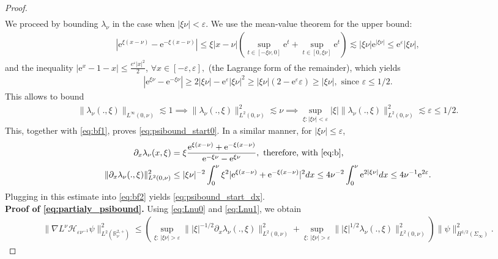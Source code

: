 \documentclass[report]{elsarticle}
\numberwithin{theorem}{section}
\newcommand{\re}{\varepsilon}
\begin{document}
\begin{proof}
\begin{align}
\end{align}
We proceed by bounding $\lambda_{\nu}$ in the case when $|\xi\nu|<\re$. We use the mean-value theorem for the upper bound:
\begin{align*}
	|\mathrm{e}^{\xi(x-\nu)}-\mathrm{e}^{-\xi(x-\nu)}|\leq \xi|x-\nu|\left(\sup_{t\in [-\xi\nu,0]}\mathrm{e}^t+\sup_{t\in [0,\xi\nu]}\mathrm{e}^t\right)\lesssim |\xi\nu|\mathrm{e}^{|\xi\nu|}\leq \mathrm{e}^{\re}|\xi\nu|,
\end{align*}
and the inequality $|\mathrm{e}^{x}-1-x|\leq \frac{e^{\re}|x|^2}{2}$, $\forall x\in [-\re,\re],$ (the Lagrange form of the remainder), which yields  
\begin{align}
	\label{eq:b}
	\left|\mathrm{e}^{\xi\nu}-\mathrm{e}^{-\xi\nu}\right|\geq 2|\xi\nu|-\mathrm{e}^{\re}|\xi\nu|^2\geq |\xi\nu|(2-\mathrm{e}^{\re}\re)\geq |\xi\nu|, \text{ since $\re\leq 1/2$.}
\end{align}
This allows to bound 
\begin{align*}
	\|\lambda_{\nu}(.,\xi)\|_{L^{\infty}(0,\nu)}\lesssim 1  \implies \|\lambda_{\nu}(.,\xi)\|^2_{L^2(0,\nu)}\lesssim \nu\implies \sup_{\xi: |\xi\nu|<\re}|\xi|\|\lambda_{\nu}(.,\xi)\|^2_{L^2(0,\nu)}\lesssim \re\leq 1/2.
\end{align*}
This, together with \eqref{eq:bf1}, proves \eqref{eq:psibound_start0}. In a similar manner, for $|\xi\nu|\leq \re$,
\begin{align*}
	\partial_x \lambda_{\nu}(x,\xi)&=\xi\frac{\mathrm{e}^{\xi(x-\nu)}+\mathrm{e}^{-\xi(x-\nu)}}{\mathrm{e}^{-\xi\nu}-\mathrm{e}^{\xi\nu}}, \text{ therefore, with \eqref{eq:b}, }\\
	\|\partial_x \lambda_{\nu}(.,\xi)\|^2_{L^2(0,\nu)}&\leq |\xi\nu|^{-2} \int_0^{\nu}\xi^2|\mathrm{e}^{\xi(x-\nu)}+\mathrm{e}^{-\xi(x-\nu)}|^2dx\leq 4\nu^{-2}\int_{0}^{\nu}\mathrm{e}^{2|\xi\nu|}dx\leq 4\nu^{-1}\mathrm{e}^{2\re}.
\end{align*}
Plugging in this estimate into \eqref{eq:bf2} yields \eqref{eq:psibound_start_dx}. \\
\textbf{Proof of \eqref{eq:partialy_psibound}. }Using \eqref{eq:Lnu0} and \eqref{eq:Lnu1}, we obtain 
\begin{align}
	\label{eq:nablaLnu}
\|\nabla L^{\nu}\mathcal{H}_{\re\nu^{-1}}\psi\|_{L^2(\mathbb{R}^{2,+}_{\nu})}^2\leq \left(\sup_{\xi: \, |\xi\nu|>\re}\||\xi|^{-1/2}\partial_x\lambda_{\nu}(.,\xi)\|^2_{L^2(0,\nu)}+\sup_{\xi: \, |\xi\nu|>\re}\||\xi|^{1/2}\lambda_{\nu}(.,\xi)\|^2_{L^2(0,\nu)}\right)\|\psi\|^2_{H^{1/2}(\Sigma_{\infty})}.
\end{align}

\end{proof}
\end{document}
